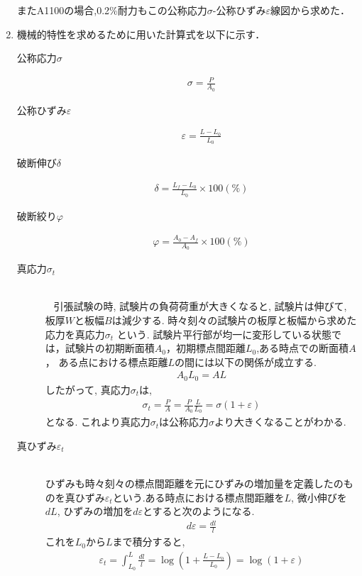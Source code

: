 \documentclass[a4paper,11pt,uplatex]{jsarticle}
\begin{document}
\begin{enumerate}
  またA1100の場合,0.2\%耐力もこの公称応力$\sigma$-公称ひずみ$\varepsilon$線図から求めた．
  \item 機械的特性を求めるために用いた計算式を以下に示す．
  \begin{description}
    \item [公称応力$\sigma$]
    \begin{align}
      \sigma = \frac{P}{A_0}
    \end{align}
    \item [公称ひずみ$\varepsilon$]
    \begin{align}
      \varepsilon = \frac{L-L_0}{L_0}
    \end{align}
    \item [破断伸び$\delta$]
    \begin{align}
      \delta = \frac{L_f-L_0}{L_0} \times 100(\%)
    \end{align}
    \item [破断絞り$\varphi$]
    \begin{align}
      \varphi = \frac{A_0-A_f}{A_0} \times 100(\%)
    \end{align}
    \item [真応力$\sigma_t$]　\\ 
    引張試験の時, 試験片の負荷荷重が大きくなると, 試験片は伸びて, 板厚$W$と板幅$B$は減少する. 時々刻々の試験片の板厚と板幅から求めた応力を真応力$\sigma_t$
    という. 試験片平行部が均一に変形している状態では，試験片の初期断面積$A_0$，初期標点間距離$L_0$,ある時点での断面積$A$，
    ある点における標点距離$L$の間には以下の関係が成立する.
    \begin{align}
      \label{6式}
      A_0L_0 = AL
    \end{align}
    したがって, 真応力$\sigma_t$は,
    \begin{align}
      \label{7式}
      \sigma_t = \frac{P}{A} = \frac{P}{A_0}\frac{L}{L_0} = \sigma(1+\varepsilon)
    \end{align}
    となる. これより真応力$\sigma_t$は公称応力$\sigma$より大きくなることがわかる.
    \item [真ひずみ$\varepsilon_t$] \mbox{} \\
    ひずみも時々刻々の標点間距離を元にひずみの増加量を定義したのものを真ひずみ$\varepsilon_t$という.ある時点における標点間距離を$L$,
    微小伸びを$dL$, ひずみの増加を$d\varepsilon$とすると次のようになる.
    \begin{align}
      d\varepsilon = \frac{dl}{l}
    \end{align}
    これを$L_0$から$L$まで積分すると,
    \begin{align}
      \label{9式}
      \varepsilon_t = \int_{L_0}^L \frac{dl}{l} = \log \left(1+\frac{L-L_0}{L_0}\right) = \log(1+\varepsilon)
    \end{align}
  \end{description}
\end{enumerate}
\end{document}
